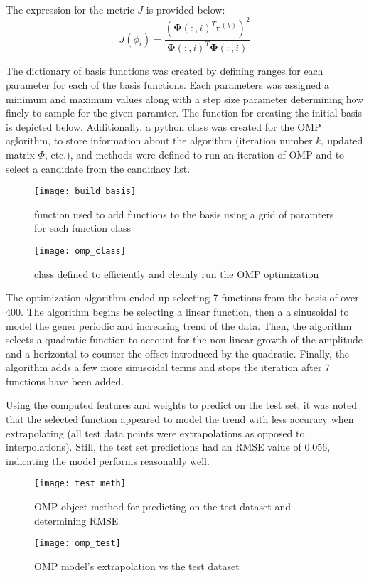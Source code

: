 \documentclass{article}
\begin{document}
The expression for the metric $J$ is provided below:
\begin{equation}
J(\phi_i) = \frac{(\mathbf{\Phi}(:,i)^T\mathbf{r}^{(k)})^2}{\mathbf{\Phi}(:,i)^T\mathbf{\Phi}(:,i)}
\end{equation}

The dictionary of basis functions was created by defining ranges for each parameter for each of the basis functions. Each parameters was assigned a minimum and maximum values along with a step size parameter determining how finely to sample for the given paramter. The function for creating the initial basis is depicted below. Additionally, a python class was created for the OMP aglorithm, to store  information about the algorithm (iteration number $k$, updated matrix $\Phi$, etc.), and methods were defined to run an iteration of OMP and to select a candidate from the candidacy list.

\begin{figure}[H]
\centering
\texttt{[image: build\_basis]}
\caption{function used to add functions to the basis using a grid of paramters for each function class}
\end{figure}

\begin{figure}[H]
\centering
\texttt{[image: omp\_class]}
\caption{class defined to efficiently and cleanly run the OMP optimization}
\end{figure}

The optimization algorithm ended up selecting 7 functions from the basis of over 400. The algorithm begins be selecting a linear function, then a a sinusoidal to model the gener periodic and increasing trend of the data. Then, the algorithm selects a quadratic function to account for the non-linear growth of the amplitude and a horizontal to counter the offset introduced by the quadratic. Finally, the algorithm adds a few more sinusoidal terms and stops the iteration after 7 functions have been added.

Using the computed features and weights to predict on the test set, it was noted that the selected function appeared to model the trend with less accuracy when extrapolating (all test data points were extrapolations as opposed to interpolations). Still, the test set predictions had an RMSE value of 0.056, indicating the model performs reasonably well.

\begin{figure}[H]
\centering
\texttt{[image: test\_meth]}
\caption{OMP object method for predicting on the test dataset and determining RMSE}
\end{figure}

\begin{figure}[H]
\centering
\texttt{[image: omp\_test]}
\caption{OMP model's extrapolation vs the test dataset}
\end{figure}
\end{document}

